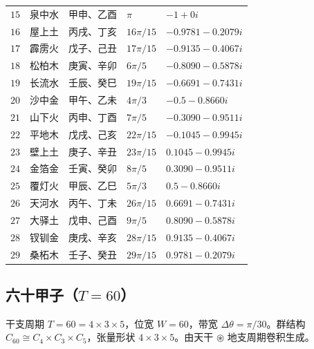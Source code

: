 \begin{center}
\begin{tabular}{>{\centering\arraybackslash}p{1cm}>{\centering\arraybackslash}p{2.5cm}>{\centering\arraybackslash}p{3cm}>{\centering\arraybackslash}p{2cm}>{\centering\arraybackslash}p{3.5cm}}
$15$ & 泉中水   & 甲申、乙酉 & $\pi$ & $-1+0i$ \\
$16$ & 屋上土   & 丙戌、丁亥 & $16\pi/15$ & $-0.9781-0.2079i$ \\
$17$ & 霹雳火   & 戊子、己丑 & $17\pi/15$ & $-0.9135-0.4067i$ \\
$18$ & 松柏木   & 庚寅、辛卯 & $6\pi/5$ & $-0.8090-0.5878i$ \\
$19$ & 长流水   & 壬辰、癸巳 & $19\pi/15$ & $-0.6691-0.7431i$ \\
$20$ & 沙中金   & 甲午、乙未 & $4\pi/3$ & $-0.5-0.8660i$ \\
$21$ & 山下火   & 丙申、丁酉 & $7\pi/5$ & $-0.3090-0.9511i$ \\
$22$ & 平地木   & 戊戌、己亥 & $22\pi/15$ & $-0.1045-0.9945i$ \\
$23$ & 壁上土   & 庚子、辛丑 & $23\pi/15$ & $0.1045-0.9945i$ \\
$24$ & 金箔金   & 壬寅、癸卯 & $8\pi/5$ & $0.3090-0.9511i$ \\
$25$ & 覆灯火   & 甲辰、乙巳 & $5\pi/3$ & $0.5-0.8660i$ \\
$26$ & 天河水   & 丙午、丁未 & $26\pi/15$ & $0.6691-0.7431i$ \\
$27$ & 大驿土   & 戊申、己酉 & $9\pi/5$ & $0.8090-0.5878i$ \\
$28$ & 钗钏金   & 庚戌、辛亥 & $28\pi/15$ & $0.9135-0.4067i$ \\
$29$ & 桑柘木   & 壬子、癸丑 & $29\pi/15$ & $0.9781-0.2079i$ \\
\bottomrule
\end{tabular}
\end{center}

\subsection{\texorpdfstring{六十甲子（$T=60$）}{六十甲子（T=60）}}

\begin{definition}[六十甲子相位算子]\label{def:ganzhi_operators}
干支周期 $T=60=4 \times 3 \times 5$，位宽 $W=60$，带宽 $\Delta\theta=\pi/30$。群结构 $C_{60} \cong C_4 \times C_3 \times C_5$，张量形状 $4 \times 3 \times 5$。由天干 $\circledast$ 地支周期卷积生成。
\end{definition}

